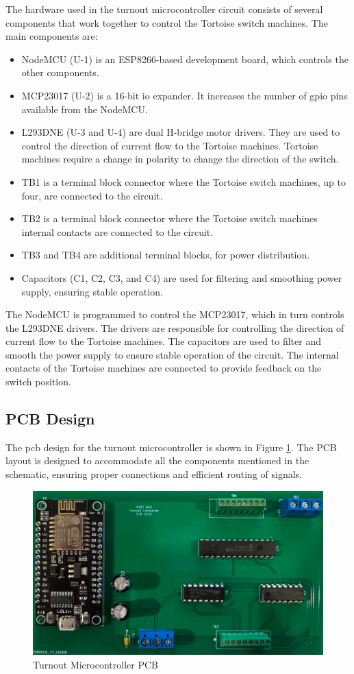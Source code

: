 The hardware used in the turnout microcontroller circuit consists of several components that work together to control the Tortoise switch machines. The main components are:
\begin{itemize}
\item NodeMCU (U-1) is an ESP8266-based development board, which controls the other components.
\item MCP23017 (U-2) is a 16-bit \gls{io} expander. It increases the number of \gls{gpio} pins available from the NodeMCU. 
\item L293DNE (U-3 and U-4) are dual H-bridge motor drivers. They are used to control the direction of current flow to the Tortoise machines. Tortoise machines require a change in polarity to change the direction of the switch. 
\item TB1 is a terminal block connector where the Tortoise switch machines, up to four, are connected to the circuit. 
\item TB2 is a terminal block connector where the Tortoise switch machines internal contacts are connected to the circuit.
\item TB3 and TB4 are additional terminal blocks, for power distribution. 
\item Capacitors (C1, C2, C3, and C4) are used for filtering and smoothing power supply, ensuring stable operation.
\end{itemize}

The NodeMCU is programmed to control the MCP23017, which in turn controls the L293DNE drivers. The drivers are responsible for controlling the direction of current flow to the Tortoise machines. 
The capacitors are used to filter and smooth the power supply to ensure stable operation of the circuit. The internal contacts of the Tortoise machines are connected to provide feedback on the switch position.
\subsection{PCB Design}
The \gls{pcb} design for the turnout microcontroller is shown in Figure \ref{fig:turnout-board}. The PCB layout is designed to accommodate all the components mentioned in the schematic, ensuring proper 
connections and efficient routing of signals.

\begin{figure}[H]
  \centering
    \includegraphics[scale=0.45]{../Images/turnout-board.jpg}
  \caption{Turnout Microcontroller PCB}
  \label{fig:turnout-board}
\end{figure}

